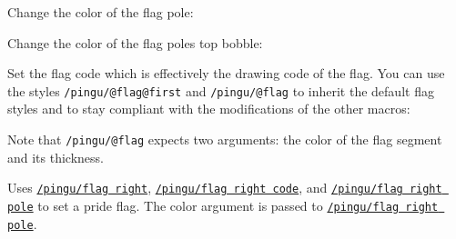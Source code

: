 \documentclass[parskip=half,english,numbers=noenddot,footnotes=nomultiple,oneside]{scrartcl}
\def\lpingu#1{\lstinline[style=lstpingu,language=pingulang]'#1'}
\newcommand*\keyref[2][/pingu/]{\hyperref[pk:#1#2]{\lpingu{#1#2}}}
\begin{document}
\begin{tcblisting}{}
\begin{tikzpicture}
	\pingu[flag right=green]
\end{tikzpicture}
\end{tcblisting}
\endkeyexplain

Change the color of the flag pole:
	\begin{tcblisting}{}
\begin{tikzpicture}
	\pingu[flag right, flag right pole=green]
\end{tikzpicture}
\end{tcblisting}
\endsubkeyexplain

Change the color of the flag poles top bobble:
	\begin{tcblisting}{}
\begin{tikzpicture}
	\pingu[flag right, flag right bobble=green]
\end{tikzpicture}
\end{tcblisting}
\endsubkeyexplain

Set the flag code which is effectively the drawing code of the flag.
You can use the styles \lpingu{/pingu/@flag@first} and \lpingu{/pingu/@flag} to inherit the default flag styles and to stay compliant with the modifications of the other macros:
	\begin{tcblisting}{}
\begin{tikzpicture}
	\pingu[flag right, flag right code={
	  \node[/pingu/@flag@first,
	  	/pingu/@flag={blue}{5mm}]
	  		(upper) at (0,0) {};
	  \node[below,/pingu/@flag={black}{4mm}]
	  	(lower) at (upper.south) {};
	}]
\end{tikzpicture}
\end{tcblisting}
Note that \lpingu{/pingu/@flag} expects two arguments: the color of the flag segment and its thickness.
\endsubkeyexplain

	Uses \keyref{flag right}, \keyref{flag right code}, and \keyref{flag right pole} to set a pride flag. The color argument is passed to \keyref{flag right pole}.
\begin{tcblisting}{}
\begin{tikzpicture}
	\pingu[pride flag right=green]
\end{tikzpicture}
\end{tcblisting}
\endkeyexplain
\end{document}
